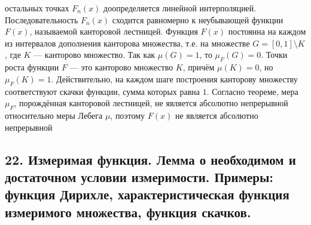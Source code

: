 \documentclass[12pt]{article}
\begin{document}
остальных точках $F_n(x)$ доопределяется линейной интерполяцией. Последовательность $F_n(x)$ сходится равномерно к неубывающей функции $F(x)$, называемой канторовой лестницей. Функция $F(x)$ постоянна на каждом из интервалов дополнения канторова множества, т.е. на множестве $G=[0,1]\setminus K$, где $K$ — канторово множество. Так как $\mu(G)=1$, то $\mu_F(G)=0$. Точки роста функции $F$ — это канторово множество $K$, причём $\mu(K)=0$, но $\mu_F(K)=1$. Действительно, на каждом шаге построения канторову множеству соответствуют скачки функции, сумма которых равна $1$. Согласно теореме, мера $\mu_F$, порождённая канторовой лестницей, не является абсолютно непрерывной относительно меры Лебега $\mu$, поэтому $F(x)$ не является абсолютно непрерывной

\subsection*{22. Измеримая функция. Лемма о необходимом и достаточном условии измеримости.
Примеры: функция Дирихле, характеристическая функция измеримого множества,
функция скачков.}
\end{document}
